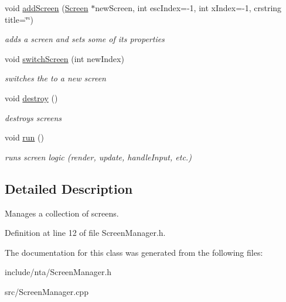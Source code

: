 \begin{DoxyCompactItemize}
void \hyperlink{classnta_1_1ScreenManager_a18659a2edcddd60d53094ac46ac0b0df}{add\+Screen} (\hyperlink{classnta_1_1Screen}{Screen} $\ast$new\+Screen, int esc\+Index=-\/1, int x\+Index=-\/1, crstring title=\char`\"{}\char`\"{})
\begin{DoxyCompactList}\small\item\em adds a screen and sets some of its properties \end{DoxyCompactList}\item 
\mbox{\label{classnta_1_1ScreenManager_a97edbb147671d2b94e1f5a13cb6f7660}} 
void \hyperlink{classnta_1_1ScreenManager_a97edbb147671d2b94e1f5a13cb6f7660}{switch\+Screen} (int new\+Index)
\begin{DoxyCompactList}\small\item\em switches the to a new screen \end{DoxyCompactList}\item 
\mbox{\label{classnta_1_1ScreenManager_ad4e28094d9293b55f38ea463ac802219}} 
void \hyperlink{classnta_1_1ScreenManager_ad4e28094d9293b55f38ea463ac802219}{destroy} ()
\begin{DoxyCompactList}\small\item\em destroys screens \end{DoxyCompactList}\item 
\mbox{\label{classnta_1_1ScreenManager_a19a9c4c96209d37d928c05777a1135b9}} 
void \hyperlink{classnta_1_1ScreenManager_a19a9c4c96209d37d928c05777a1135b9}{run} ()
\begin{DoxyCompactList}\small\item\em runs screen logic (render, update, handle\+Input, etc.) \end{DoxyCompactList}\end{DoxyCompactItemize}


\subsection{Detailed Description}
Manages a collection of screens. 

Definition at line 12 of file Screen\+Manager.\+h.



The documentation for this class was generated from the following files\+:\begin{DoxyCompactItemize}
\item 
include/nta/Screen\+Manager.\+h\item 
src/Screen\+Manager.\+cpp\end{DoxyCompactItemize}

